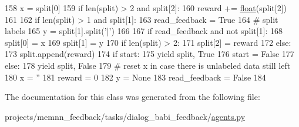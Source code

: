 \begin{DoxyCode}
158                         x = split[0]
159                 \textcolor{keywordflow}{if} len(split) > 2 \textcolor{keywordflow}{and} split[2]:
160                     reward += \hyperlink{namespaceprojects_1_1controllable__dialogue_1_1make__control__dataset_aa2b7207688c641dbc094ab44eca27113}{float}(split[2])
161 
162                 \textcolor{keywordflow}{if} len(split) > 1 \textcolor{keywordflow}{and} split[1]:
163                     read\_feedback = \textcolor{keyword}{True}
164                     \textcolor{comment}{# split labels}
165                     y = split[1].split(\textcolor{stringliteral}{'|'})
166 
167                 \textcolor{keywordflow}{if} read\_feedback \textcolor{keywordflow}{and} \textcolor{keywordflow}{not} split[1]:
168                     split[0] = x
169                     split[1] = y
170                     \textcolor{keywordflow}{if} len(split) > 2:
171                         split[2] = reward
172                     \textcolor{keywordflow}{else}:
173                         split.append(reward)
174                     \textcolor{keywordflow}{if} start:
175                         \textcolor{keywordflow}{yield} split, \textcolor{keyword}{True}
176                         start = \textcolor{keyword}{False}
177                     \textcolor{keywordflow}{else}:
178                         \textcolor{keywordflow}{yield} split, \textcolor{keyword}{False}
179                     \textcolor{comment}{# reset x in case there is unlabeled data still left}
180                     x = \textcolor{stringliteral}{''}
181                     reward = 0
182                     y = \textcolor{keywordtype}{None}
183                     read\_feedback = \textcolor{keyword}{False}
184 \end{DoxyCode}


The documentation for this class was generated from the following file\+:\begin{DoxyCompactItemize}
\item 
projects/memnn\+\_\+feedback/tasks/dialog\+\_\+babi\+\_\+feedback/\hyperlink{projects_2memnn__feedback_2tasks_2dialog__babi__feedback_2agents_8py}{agents.\+py}\end{DoxyCompactItemize}
